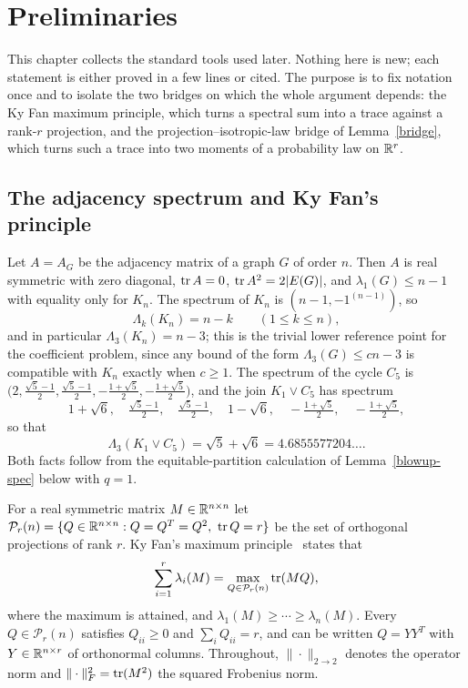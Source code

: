 \chapter{Preliminaries}\label{ch-prelim}
This chapter collects the standard tools used later. Nothing here is new;
each statement is either proved in a few lines or cited. The purpose is to
fix notation once and to isolate the two bridges on which the whole argument
depends: the Ky Fan maximum principle, which turns a spectral sum into a
trace against a rank-$r$ projection, and the projection--isotropic-law bridge
of Lemma~\ref{bridge}, which turns such a trace into two moments of a
probability law on $\mathbb R^r$.

\section{The adjacency spectrum and Ky Fan's principle}
Let $A=A_G$ be the adjacency matrix of a graph $G$ of order $n$. Then $A$ is
real symmetric with zero diagonal, $\operatorname{tr} A=0$, $\operatorname{tr} A^2=2|E(G)|$, and
$\lambda_1(G)\le n-1$ with equality only for $K_n$. The spectrum of $K_n$ is
$(n-1,-1^{(n-1)})$, so
\begin{equation}\label{kn-lambda3}
 \Lambda_k(K_n)=n-k\qquad(1\le k\le n),
\end{equation}
and in particular $\Lambda_3(K_n)=n-3$; this is the trivial lower reference
point for the coefficient problem, since any bound of the form
$\Lambda_3(G)\le cn-3$ is compatible with $K_n$ exactly when $c\ge1$.
The spectrum of the cycle $C_5$ is
$\bigl(2,\tfrac{\sqrt5-1}2,\tfrac{\sqrt5-1}2,-\tfrac{1+\sqrt5}2,
-\tfrac{1+\sqrt5}2\bigr)$, and the join $K_1\vee C_5$ has spectrum
\[
 1+\sqrt6,\quad \tfrac{\sqrt5-1}2,\quad \tfrac{\sqrt5-1}2,\quad
 1-\sqrt6,\quad -\tfrac{1+\sqrt5}2,\quad -\tfrac{1+\sqrt5}2,
\]
so that
\begin{equation}\label{k1c5-lambda3}
 \Lambda_3(K_1\vee C_5)=\sqrt5+\sqrt6=4.6855577204\ldots .
\end{equation}
Both facts follow from the equitable-partition calculation of
Lemma~\ref{blowup-spec} below with $q=1$.

For a real symmetric matrix $M\in\mathbb R^{n\times n}$ let
$\mathcal P_r(n)=\{Q\in\R^{n\times n}:Q=Q^T=Q^2,\ \tr Q=r\}$ be the set of
orthogonal projections of rank $r$. Ky Fan's maximum principle~\cite{KyFan}
states that
\begin{equation}\label{kyfan}
 \sum_{i=1}^r\lambda_i(M)=\max_{Q\in\mathcal P_r(n)}\operatorname{tr}(MQ),
\end{equation}
where the maximum is attained, and $\lambda_1(M)\ge\cdots\ge\lambda_n(M)$.
Every $Q\in\mathcal P_r(n)$ satisfies $Q_{ii}\ge0$ and $\sum_iQ_{ii}=r$, and
can be written $Q=YY^T$ with $Y\in\mathbb R^{n\times r}$ of orthonormal columns.
Throughout, $\|\cdot\|_{2\to2}$ denotes the operator norm and
$\|\cdot\|_F^2=\operatorname{tr}(M^2)$ the squared Frobenius norm.

